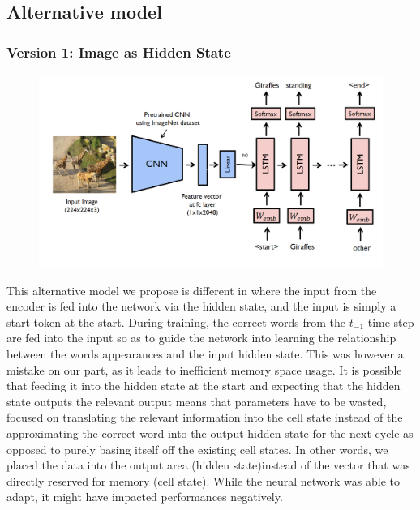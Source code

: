 \documentclass{proc}
\begin{document}
\subsection{Alternative model}
\subsubsection{Version 1: Image as Hidden State}
\begin{figure}[h!]
  \includegraphics[width=\linewidth]{Flow1.png}
\end{figure}
This alternative model we propose is different in where the input from the encoder is fed into the network via the hidden state, and the input is simply a start token at the start. During training, the correct words from the $t_{-1}$ time step are fed into the input so as to guide the network into learning the relationship between the words appearances and the input hidden state. This was however a mistake on our part, as it leads to inefficient memory space usage. It is possible that feeding it into the hidden state at the start and expecting that the hidden state outputs the relevant output means that parameters have to be wasted, focused on translating the relevant information into the cell state instead of the approximating the correct word into the output hidden state for the next cycle as opposed to purely basing itself off the existing cell states. In other words, we placed the data into the output area (hidden state)instead of the vector that was directly reserved for memory (cell state). While the neural network was able to adapt, it might have impacted performances negatively.
\end{document}
